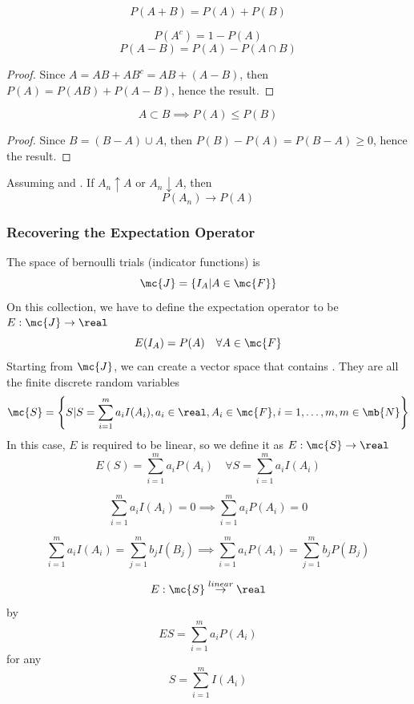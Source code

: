 \documentclass[11pt]{article}
\numberwithin{equation}{section}
\begin{document}
$$P(A + B) = P(A) + P(B)$$

\corollary[complementarity]
$$P(A^c) = 1 - P(A)$$
$$P(A - B) = P(A) - P(A\cap B)$$
\begin{proof}
	Since $A = AB + AB^c = AB + (A-B)$, then $P(A) = P(AB) + P(A-B)$, hence the result.
\end{proof}

\corollary[monotonicity]
$$A \subset B \implies P(A) \leq P(B)$$
\begin{proof}
	Since $B = (B - A) \cup A$, then $P(B) - P(A) = P(B - A) \geq 0$, hence the result.
\end{proof}

\proposition
Assuming  and . If $A_n \uparrow A$ or $A_n \downarrow A$, then
$$P(A_n) \rightarrow P(A)$$

\subsubsection{Recovering the Expectation Operator}
The space of bernoulli trials (indicator functions) is
$$ \mc{J} = \{I_A | A \in \mc{F}\}$$
On this collection, we have to define the expectation operator to be $E: \mc{J} \rightarrow \real$
$$E(I_A) = P(A) \quad \forall A \in \mc{F}$$
Starting from $\mc{J}$, we can create a vector space that contains . They are all the finite discrete random variables
$$\mc{S} = \left \{ S | S = \sum_{i=1}^m a_i I(A_i), a_i \in \real, A_i \in \mc{F}, i = 1, \hdots, m, m \in \mb{N} \right\}$$
In this case, $E$ is required to be linear, so we define it as $E: \mc{S} \rightarrow \real$
$$ E(S) = \sum_{i=1}^m a_iP(A_i) \quad \forall S = \sum_{i=1}^m a_iI(A_i)$$

\begin{equation}
	\sum_{i=1}^m a_i I(A_i) = 0 \implies \sum_{i=1}^m a_i P(A_i) = 0
\end{equation}

\corollary[invariance]
\begin{equation}
	\sum_{i=1}^ma_iI(A_i) = \sum_{j=1}^mb_jI(B_j) \implies \sum_{i=1}^ma_iP(A_i) = \sum_{j=1}^mb_jP(B_j)
\end{equation}

\corollary[linearity]
$$E: \mc{S} \overset{linear}{\rightarrow} \real$$ by
$$ES = \sum_{i=1}^ma_iP(A_i)$$ for any $$S = \sum_{i=1}^m I(A_i)$$
\end{document}
